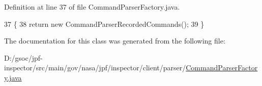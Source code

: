 Definition at line 37 of file Command\+Parser\+Factory.\+java.


\begin{DoxyCode}
37                                                                  \{
38     \textcolor{keywordflow}{return} \textcolor{keyword}{new} CommandParserRecordedCommands();
39   \}
\end{DoxyCode}


The documentation for this class was generated from the following file\+:\begin{DoxyCompactItemize}
\item 
D\+:/gsoc/jpf-\/inspector/src/main/gov/nasa/jpf/inspector/client/parser/\hyperlink{_command_parser_factory_8java}{Command\+Parser\+Factory.\+java}\end{DoxyCompactItemize}
